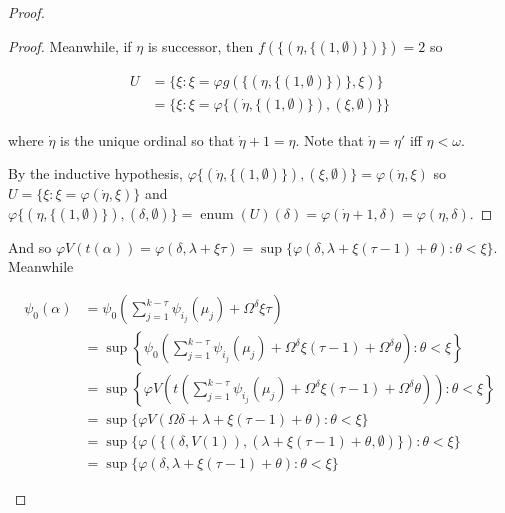 \documentclass{article}
\theoremstyle{definition}
\theoremstyle{plain}
\theoremstyle{plain}
\theoremstyle{plain}
\theoremstyle{plain}
\theoremstyle{remark}
\theoremstyle{remark}
\theoremstyle{remark}
\theoremstyle{plain}
\theoremstyle{plain}
\begin{document}
\begin{proof}
\begin{enumerate}
\begin{enumerate}
\begin{enumerate}
\begin{enumerate}
\begin{proof}
                Meanwhile, if $\eta$ is successor, then $f(\{(\eta, \{(1,\emptyset)\})\}) = 2$ so
            
                \begin{equation}
                \begin{split}
                U & = \{\xi: \xi = \varphi g(\{(\eta, \{(1,\emptyset)\})\}, \xi)\} \\ & = \{\xi: \xi = \varphi \{(\dot{\eta},\{(1,\emptyset)\}),(\xi, \emptyset)\}\}
                \end{split}
                \end{equation}
            
                where $\dot{\eta}$ is the unique ordinal so that $\dot{\eta}+1 = \eta$. Note that $\dot{\eta} = \eta'$ iff $\eta < \omega$.
            
                By the inductive hypothesis, $\varphi \{(\dot{\eta},\{(1,\emptyset)\}),(\xi, \emptyset)\} = \varphi(\dot{\eta}, \xi)$ so $U = \{\xi: \xi = \varphi(\dot{\eta}, \xi)\}$ and $\varphi \{(\eta, \{(1,\emptyset)\}), (\delta, \emptyset)\} = \operatorname{enum}(U)(\delta) = \varphi(\dot{\eta}+1, \delta) = \varphi(\eta, \delta)$.
                \end{proof}
            
                And so $\varphi V(t(\alpha)) = \varphi(\delta, \lambda + \xi \tau) = \sup\{\varphi(\delta, \lambda + \xi (\tau - 1) + \theta): \theta < \xi\}$. Meanwhile
        
                \begin{equation}
                \begin{split}
                \psi_0(\alpha) & = \psi_0\left(\sum_{j = 1}^{k-\tau} \psi_{i_j}(\mu_j) + \Omega^\delta \xi \tau\right) \\ & = \sup\left\{\psi_0\left(\sum_{j = 1}^{k-\tau} \psi_{i_j}(\mu_j) + \Omega^\delta \xi (\tau-1) + \Omega^\delta \theta \right): \theta < \xi\right\} \\ & = \sup\left\{\varphi V\left(t\left(\sum_{j = 1}^{k-\tau} \psi_{i_j}(\mu_j) + \Omega^\delta \xi (\tau-1) + \Omega^\delta \theta\right)\right): \theta < \xi\right\} \\ & = \sup\{\varphi V(\Omega \delta + \lambda + \xi (\tau-1) + \theta): \theta < \xi\} \\ & = \sup\{\varphi (\{(\delta, V(1)), (\lambda + \xi (\tau-1) + \theta, \emptyset)\}): \theta < \xi\} \\ & = \sup\{\varphi(\delta, \lambda + \xi (\tau-1) + \theta): \theta < \xi\}
                \end{split}
                \end{equation}
                

\end{enumerate}
\end{enumerate}
\end{enumerate}
\end{enumerate}
\end{proof}
\end{document}

